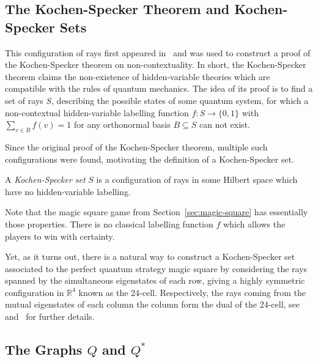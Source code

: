 \subsection{The Kochen-Specker Theorem and Kochen-Specker Sets}\label{sec:ksset}
This configuration of rays first appeared in~\cite{ZIMBA1993697}
and was used to construct a proof of the Kochen-Specker
theorem on non-contextuality.
In short, the Kochen-Specker theorem claims the
non-existence of hidden-variable theories which are compatible
with the rules of quantum mechanics.
The idea of its proof is to find a set of rays $S$,
describing the possible states of some quantum system,
for which a non-contextual hidden-variable labelling function $f:S \rightarrow \{0, 1\}$
with $\sum_{v \in B} f(v) = 1$ for any orthonormal basis $B \subseteq S$ can not exist.

Since the original proof of the Kochen-Specker theorem,
multiple such configurations were found,
motivating the definition of a Kochen-Specker set.
\begin{definition}
    A \emph{Kochen-Specker set} $S$ is a configuration of
    rays in some Hilbert space which have no hidden-variable labelling.
\end{definition}
Note that the magic square game from Section~\ref{sec:magic-square} has essentially those properties.
There is no classical labelling function $f$ which allows the players
to win with certainty.

Yet, as it turns out, there is a natural way to construct a Kochen-Specker set
associated to the perfect quantum strategy magic square
by considering the rays spanned by the simultaneous eigenstates of each row, giving 
a highly symmetric configuration in $\mathbb{R}^4$ known as the 24-cell.
Respectively, the rays coming from the mutual eigenstates
of each column the column form the dual of the 24-cell, see~\cite{article} and~\cite{quant1365359} for further details.


\subsection{The Graphs $Q$ and $Q^*$}


